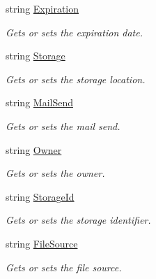 \begin{DoxyCompactItemize}
string \hyperlink{classowncloudsharp_1_1_types_1_1_advanced_share_properties_a8a86e701a2c7a7b0f1c680698ddca880}{Expiration}
\begin{DoxyCompactList}\small\item\em Gets or sets the expiration date. \end{DoxyCompactList}\item 
string \hyperlink{classowncloudsharp_1_1_types_1_1_advanced_share_properties_adab4924c763e36e0e856d28b74d5a579}{Storage}
\begin{DoxyCompactList}\small\item\em Gets or sets the storage location. \end{DoxyCompactList}\item 
string \hyperlink{classowncloudsharp_1_1_types_1_1_advanced_share_properties_a73d194741812b8cc3c21dc22c620fd5f}{Mail\+Send}
\begin{DoxyCompactList}\small\item\em Gets or sets the mail send. \end{DoxyCompactList}\item 
string \hyperlink{classowncloudsharp_1_1_types_1_1_advanced_share_properties_ac490ec6436b080108d9187fc977610f1}{Owner}
\begin{DoxyCompactList}\small\item\em Gets or sets the owner. \end{DoxyCompactList}\item 
string \hyperlink{classowncloudsharp_1_1_types_1_1_advanced_share_properties_a293f3ebc8934e70f5a52b08ebe51236a}{Storage\+Id}
\begin{DoxyCompactList}\small\item\em Gets or sets the storage identifier. \end{DoxyCompactList}\item 
string \hyperlink{classowncloudsharp_1_1_types_1_1_advanced_share_properties_a7a636c605e2eeda78dfad180f75f9b4b}{File\+Source}
\begin{DoxyCompactList}\small\item\em Gets or sets the file source. \end{DoxyCompactList}\item 

\end{DoxyCompactItemize}
